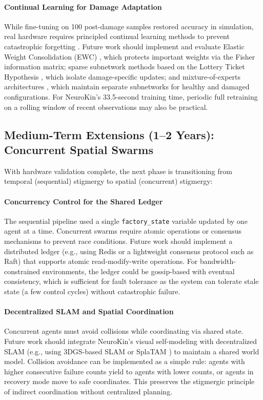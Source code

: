 \documentclass[12pt,a4paper,oneside]{report}
\begin{document}
\paragraph{Continual Learning for Damage Adaptation}
While fine-tuning on 100 post-damage samples restored accuracy in simulation, real hardware requires principled continual learning methods to prevent catastrophic forgetting \cite{grossberg1987competitive, mermillod2013stability}. Future work should implement and evaluate Elastic Weight Consolidation (EWC) \cite{kirkpatrick2017overcoming}, which protects important weights via the Fisher information matrix; sparse subnetwork methods based on the Lottery Ticket Hypothesis \cite{frankle2018lottery}, which isolate damage-specific updates; and mixture-of-experts architectures \cite{mocanu2018scalable}, which maintain separate subnetworks for healthy and damaged configurations. For NeuroKin's 33.5-second training time, periodic full retraining on a rolling window of recent observations may also be practical.

\subsection{Medium-Term Extensions (1–2 Years): Concurrent Spatial Swarms}

With hardware validation complete, the next phase is transitioning from temporal (sequential) stigmergy to spatial (concurrent) stigmergy:

\paragraph{Concurrency Control for the Shared Ledger}
The sequential pipeline used a single \texttt{factory\_state} variable updated by one agent at a time. Concurrent swarms require atomic operations or consensus mechanisms to prevent race conditions. Future work should implement a distributed ledger (e.g., using Redis or a lightweight consensus protocol such as Raft) that supports atomic read-modify-write operations. For bandwidth-constrained environments, the ledger could be gossip-based with eventual consistency, which is sufficient for fault tolerance as the system can tolerate stale state (a few control cycles) without catastrophic failure.

\paragraph{Decentralized SLAM and Spatial Coordination}
Concurrent agents must avoid collisions while coordinating via shared state. Future work should integrate NeuroKin's visual self-modeling with decentralized SLAM (e.g., using 3DGS-based SLAM \cite{matsuki2024gaussian} or SplaTAM \cite{keetha2024splattam}) to maintain a shared world model. Collision avoidance can be implemented as a simple rule: agents with higher consecutive failure counts yield to agents with lower counts, or agents in recovery mode move to safe coordinates. This preserves the stigmergic principle of indirect coordination without centralized planning.
\end{document}
